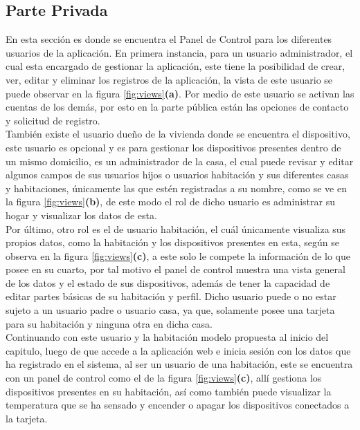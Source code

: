 \subsection{Parte Privada}

En esta sección es donde se encuentra el Panel de Control para los diferentes usuarios de la aplicación. En primera instancia, para un usuario administrador, el cual esta encargado de gestionar la aplicación, este tiene la posibilidad de crear, ver, editar y eliminar los registros de la aplicación, la vista de este usuario se puede observar en la figura \ref{fig:views}\textbf{(a)}. Por medio de este usuario se activan las cuentas de los demás, por esto en la parte pública están las opciones de contacto y solicitud de registro.\\

También existe el usuario dueño de la vivienda donde se encuentra el dispositivo, este usuario es opcional y es para gestionar los dispositivos presentes dentro de un mismo domicilio, es un administrador de la casa, el cual puede revisar y editar algunos campos de sus usuarios hijos o usuarios habitación y sus diferentes casas y habitaciones, únicamente las que estén registradas a su nombre, como se ve en la figura \ref{fig:views}\textbf{(b)}, de este modo el rol de dicho usuario es administrar su hogar y visualizar los datos de esta.\\

Por último, otro rol es el de usuario habitación, el cuál únicamente visualiza sus propios datos, como la habitación y los dispositivos presentes en esta, según se observa en la figura \ref{fig:views}\textbf{(c)}, a este solo le compete la información de lo que posee en su cuarto, por tal motivo el panel de control muestra una vista general de los datos y el estado de sus dispositivos, además de tener la capacidad de editar partes básicas de su habitación y perfil. Dicho usuario puede o no estar sujeto a un usuario padre o usuario casa, ya que, solamente posee una tarjeta para su habitación y ninguna otra en dicha casa.\\

Continuando con este usuario y la habitación modelo propuesta al inicio del capitulo, luego de que accede a la aplicación web e inicia sesión con los datos que ha registrado en el sistema, al ser un usuario de una habitación, este se encuentra con un panel de control como el de la figura \ref{fig:views}\textbf{(c)}, allí gestiona los dispositivos presentes en su habitación, así como también puede visualizar la temperatura que se ha sensado y encender o apagar los dispositivos conectados a la tarjeta.\\


